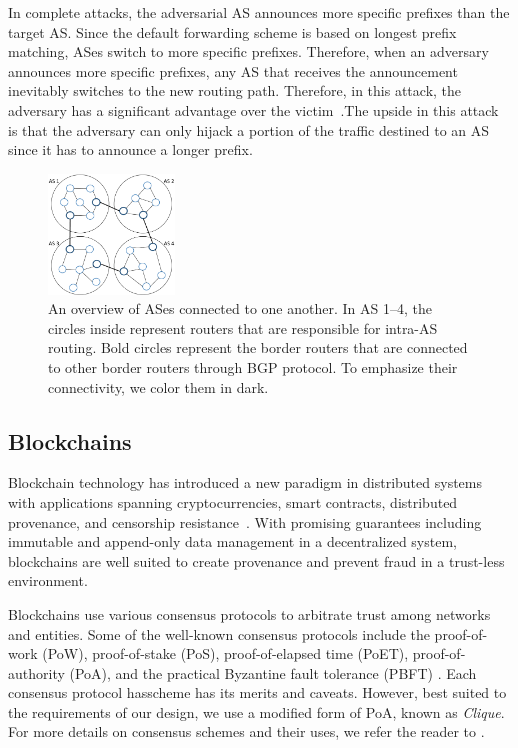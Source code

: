 \documentclass[5p]{elsarticle}
\begin{document}
In complete attacks, the adversarial AS announces more specific prefixes than the target AS. Since the default forwarding scheme is based on longest prefix matching, ASes switch to more specific prefixes. Therefore, when an adversary announces more specific prefixes, any AS that receives the announcement inevitably switches to the new routing path. Therefore, in this attack, the adversary has a significant advantage over the victim~\cite{BGPHijack}.The upside in this attack is that the adversary can only hijack a portion of the traffic destined to an AS since it has to announce a longer prefix.

\begin{figure}[t]
\begin{center}
\includegraphics[width=0.30\textwidth]{fig/ASes.pdf}
\caption{An overview of ASes connected to one another. In AS 1--4, the circles inside represent routers that are responsible for intra-AS routing. Bold circles represent the border routers that are connected to other border routers through BGP protocol. To emphasize their connectivity, we color them in dark.  } 
\label{fig:ASes}
\end{center}

\end{figure}


\subsection{Blockchains} \label{sec:BC}
Blockchain technology has introduced a new paradigm in distributed systems with applications spanning cryptocurrencies, smart contracts, distributed provenance, and censorship resistance~\cite{NeisseSN17,Omohundro14,GovernatoriIMRS18,AhmadSBM18}. With promising guarantees including immutable and append-only data management in a decentralized system, blockchains are well suited to create provenance and prevent fraud in a trust-less environment. 

Blockchains use various consensus protocols to arbitrate trust among networks and entities. Some of the well-known consensus protocols include the proof-of-work (PoW), proof-of-stake (PoS), proof-of-elapsed time (PoET), proof-of-authority (PoA), and the practical Byzantine fault tolerance (PBFT) \cite{SaadM18,SaadNKM18}. Each consensus protocol hasscheme has its merits and caveats. However, best suited to the requirements of our design, we use a modified form of PoA, known as {\em Clique}. For more details on consensus schemes and their uses, we refer the reader to \cite{Bano:2017b}.
\end{document}

